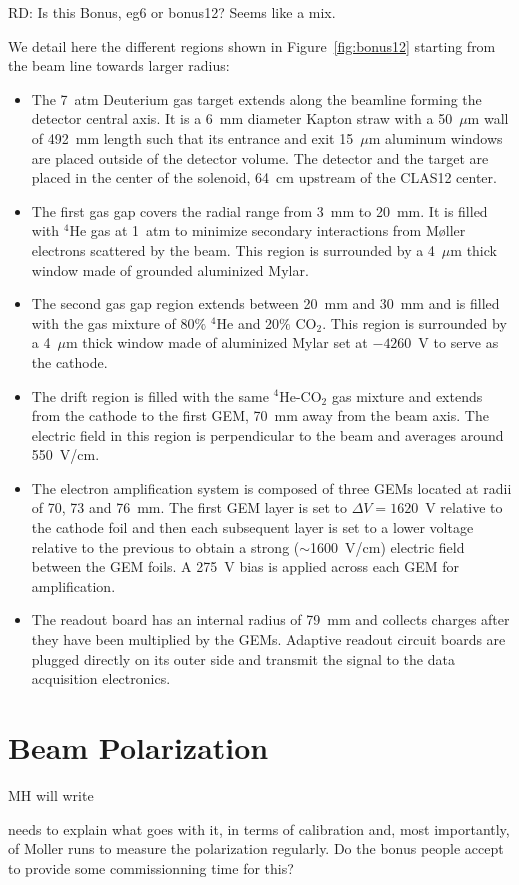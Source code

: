 RD: Is this Bonus, eg6 or bonus12? Seems like a mix.

We detail here the different regions shown in Figure~\ref{fig:bonus12} starting 
from the beam line towards larger radius:\\
\begin{itemize}
  \item The 7~atm Deuterium gas target extends along the beamline forming the 
     detector central axis. It is a 6~mm diameter Kapton straw with a 50~$\mu$m 
      wall of 492~mm length such that its entrance and exit 15~$\mu$m aluminum 
      windows are placed outside of the detector volume.  The detector and the 
      target are placed in the center of the solenoid, 64~cm upstream of the 
      CLAS12 center.
   \item The first gas gap covers the radial range from 3~mm to 20~mm. It is 
      filled with $^{4}$He gas at 1~atm to minimize secondary interactions from
      M\o{}ller electrons scattered by the beam. This region is surrounded by a 
      4~$\mu$m thick window made of grounded aluminized Mylar.
   \item The second gas gap region extends between 20~mm and 30~mm and is 
      filled with the gas mixture of 80$\%$ $^{4}$He and 20$\%$ CO$_2$. This 
      region is surrounded by a 4~$\mu$m thick window made of aluminized Mylar 
      set at $-4260$~V to serve as the cathode.
   \item The drift region is filled with the same $^4$He-CO$_2$ gas mixture and 
      extends from the cathode to the first GEM, 70~mm away from the beam axis.  
      The electric field in this region is perpendicular to the beam and 
      averages around 550~V/cm.
   \item The electron amplification system is composed of three GEMs located at 
      radii of 70, 73 and 76~mm. The first GEM layer is set to $\Delta 
      V=1620$~V relative to the cathode foil and then each subsequent layer is 
      set to a lower voltage relative to the previous to obtain a strong 
      ($\sim$1600~V/cm) electric field between the GEM foils. A 275~V bias is 
      applied across each GEM for amplification.
   \item The readout board has an internal radius of 79~mm and collects charges 
      after they have been multiplied by the GEMs. Adaptive readout circuit 
      boards are plugged directly on its outer side and transmit the signal to 
      the data acquisition electronics.
\end{itemize}



\section{Beam Polarization}

MH will write

needs to explain what goes with it, in terms of calibration and, most importantly, 
of Moller runs to measure the polarization regularly. Do the bonus people accept to 
provide some commissionning time for this?


